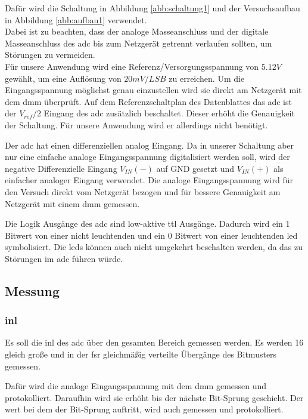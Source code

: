 \documentclass[12pt, a4paper, ngerman]{article}
\begin{document}
Dafür wird die Schaltung in Abbildung \ref{abb:schaltung1}
und der Versuchsaufbau in Abbildung \ref{abb:aufbau1} verwendet. \\
Dabei ist zu beachten, dass der analoge Masseanschluss und der digitale Masseanschluss des \ac{adc}
bis zum Netzgerät getrennt verlaufen sollten, um Störungen zu vermeiden. \\
Für unsere Anwendung wird eine Referenz/Versorgungsspannung von $5.12V$ gewählt, um eine Auflösung von $20mV/LSB$ zu erreichen.
Um die Eingangsspannung möglichst genau einzustellen wird sie direkt am Netzgerät mit dem \ac{dmm} überprüft.
Auf dem Referenzschaltplan des Datenblattes das \ac{adc} ist der $V_{ref}/2$ Eingang
des \ac{adc} zusätzlich beschaltet. Dieser erhöht die Genauigkeit der Schaltung. %
Für unsere Anwendung wird er allerdings nicht benötigt.

Der \ac{adc} hat einen differenziellen analog Eingang.
Da in unserer Schaltung aber nur eine einfache analoge Eingangsspannung digitalisiert werden soll,
wird der negative Differenzielle Eingang $V_{IN}(-)$ auf GND gesetzt und $V_{IN}(+)$ als einfacher analoger Eingang verwendet.
Die analoge Eingangsspannung wird für den Versuch direkt vom Netzgerät bezogen
und für bessere Genauigkeit am Netzgerät mit einem \ac{dmm} gemessen.

Die Logik Ausgänge des \ac{adc} sind low-aktive \ac{ttl} Ausgänge.
Dadurch wird ein 1 Bitwert von einer nicht leuchtenden und ein 0 Bitwert von einer leuchtenden \ac{led} symbolisiert.
Die \ac{led}s können auch nicht umgekehrt beschalten werden, da das zu Störungen im \ac{adc} führen würde.

\subsection{Messung}

\subsubsection{\acl{inl}}\label{sec:inl}

Es soll die \ac{inl} des \ac{adc} über den gesamten Bereich gemessen werden.
Es werden 16 gleich große und in der \ac{fsr} gleichmäßig verteilte Übergänge des Bitmusters gemessen.

Dafür wird die analoge Eingangsspannung mit dem \ac{dmm} gemessen und protokolliert.
Daraufhin wird sie erhöht bis der nächste Bit-Sprung geschieht.
Der wert bei dem der Bit-Sprung auftritt, wird auch gemessen und protokolliert.
\end{document}
